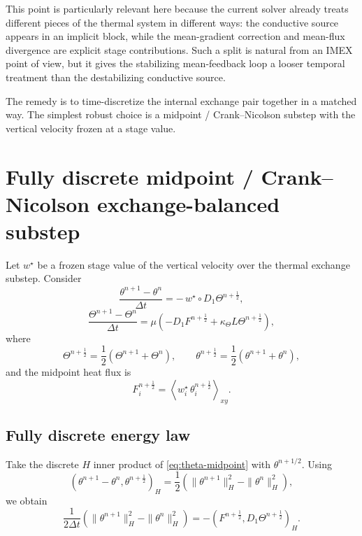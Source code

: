 \documentclass[11pt]{article}
\begin{document}
This point is particularly relevant here because the current solver already treats different pieces of the thermal system in different ways: the conductive source appears in an implicit block, while the mean-gradient correction and mean-flux divergence are explicit stage contributions. Such a split is natural from an IMEX point of view, but it gives the stabilizing mean-feedback loop a looser temporal treatment than the destabilizing conductive source.

The remedy is to time-discretize the internal exchange pair together in a matched way. The simplest robust choice is a midpoint / Crank--Nicolson substep with the vertical velocity frozen at a stage value.

\section{Fully discrete midpoint / Crank--Nicolson exchange-balanced substep}

Let $w^\star$ be a frozen stage value of the vertical velocity over the thermal exchange substep. Consider
\begin{equation}
\frac{\theta^{n+1}-\theta^n}{\Delta t}
=
-\,w^\star \circ D_1\Theta^{n+\frac12},
\label{eq:theta-midpoint}
\end{equation}
\begin{equation}
\frac{\Theta^{n+1}-\Theta^n}{\Delta t}
=
\mu
\left(
- D_1 F^{n+\frac12}
+
\kappa_\Theta L\Theta^{n+\frac12}
\right),
\label{eq:Theta-midpoint}
\end{equation}
where
\[
\Theta^{n+\frac12} = \frac12(\Theta^{n+1}+\Theta^n),
\qquad
\theta^{n+\frac12} = \frac12(\theta^{n+1}+\theta^n),
\]
and the midpoint heat flux is
\begin{equation}
F_i^{n+\frac12}
=
\left\langle
w_i^\star \,\theta_i^{n+\frac12}
\right\rangle_{xy}.
\label{eq:F-half}
\end{equation}

\subsection{Fully discrete energy law}

Take the discrete $H$ inner product of \eqref{eq:theta-midpoint} with $\theta^{n+1/2}$. Using
\[
(\theta^{n+1}-\theta^n,\theta^{n+\frac12})_H
=
\frac12\left(
\|\theta^{n+1}\|_H^2 - \|\theta^n\|_H^2
\right),
\]
we obtain
\begin{equation}
\frac{1}{2\Delta t}
\left(
\|\theta^{n+1}\|_H^2 - \|\theta^n\|_H^2
\right)
=
-
(F^{n+\frac12},D_1\Theta^{n+\frac12})_H.
\label{eq:theta-energy-mid}
\end{equation}
\end{document}
